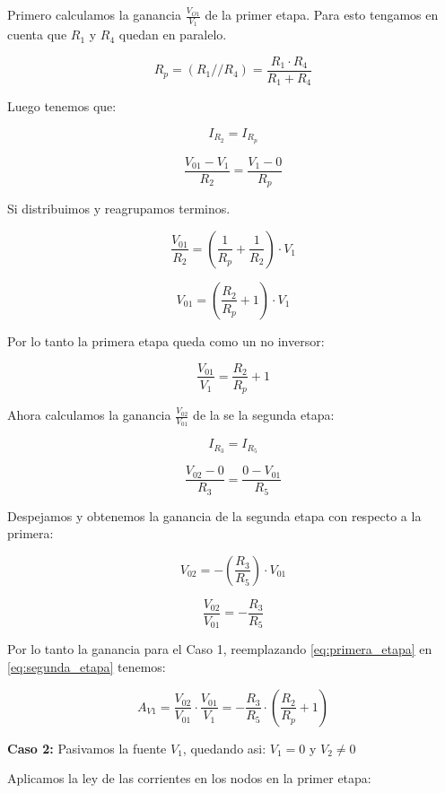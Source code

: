 Primero calculamos la ganancia $\frac{V_{O1}}{V_1}$ de la primer etapa. Para esto tengamos en cuenta que $R_1$ y $R_4$ quedan en paralelo. 

\vspace{1em}

\[{R_p = {(R_1 // R_4)} = \frac{R_1 \cdot R_4}{R_1 + R_4}}\]

Luego tenemos que: 

\[I_{R_2} = I_{R_p}\]

\[\frac{V_{01} - V_1}{R_2}
      = \frac{V_1 - 0}{R_p}\]

Si distribuimos y reagrupamos terminos.

\[\frac{V_{01}}{R_2} = (\frac{1}{R_p}+\frac{1}{R_2}) \cdot {V_1}\]
      
\[{V_{01}} = (\frac{R_2}{R_p}+{1}) \cdot {V_1}\]

Por lo tanto la primera etapa queda como un no inversor:


\begin{equation}\label{eq:primera_etapa} 
\frac{V_{01}}{V_1} = \frac{R_2}{R_p}+{1}
\end{equation}

      
Ahora calculamos la ganancia $\frac{V_{02}}{V_{01}}$ de la se la segunda etapa:

\[I_{R_3} = I_{R_5}\]


\[\frac{V_{02} - 0 }{R_3} = \frac{0 - V_{01}}{R_5}\]


Despejamos y obtenemos la ganancia de la segunda etapa con respecto a la primera:

\[V_{02} = -(\frac{R_3}{R_5}) \cdot {V_{01}}\]   


\begin{equation}\label{eq:segunda_etapa} 
\frac{V_{02}}{V_{01}} = -\frac{R_3}{R_5}
\end{equation}

Por lo tanto la ganancia para el Caso 1, reemplazando \eqref{eq:primera_etapa} en \eqref{eq:segunda_etapa} tenemos:

\[ A_{V1} = \frac{V_{02}}{V_{01}} \cdot \frac{V_{01}}{V_1} = -\frac{R_3}{R_5} \cdot (\frac{R_2}{R_p}+{1})  \]

\vspace{1em}

\textbf{Caso 2:} Pasivamos la fuente $V_1$, quedando asi: $V_1 = 0$ y $V_2 \neq 0$

\vspace{1em}

Aplicamos la ley de las corrientes en los nodos en la primer etapa:



